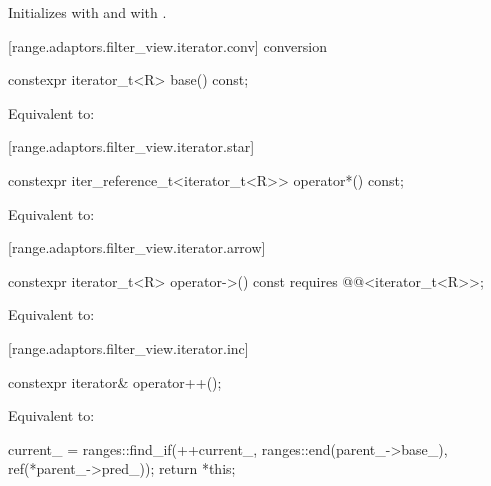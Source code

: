 \begin{addedblock}
\begin{itemdescr}
\pnum
\effects Initializes  with  and
 with .
\end{itemdescr}

[range.adaptors.filter_view.iterator.conv]{ conversion}

%
\begin{itemdecl}
constexpr iterator_t<R> base() const;
\end{itemdecl}

\begin{itemdescr}
\pnum
\effects Equivalent to: 
\end{itemdescr}

[range.adaptors.filter_view.iterator.star]{}

%
\begin{itemdecl}
constexpr iter_reference_t<iterator_t<R>> operator*() const;
\end{itemdecl}

\begin{itemdescr}
\pnum
\effects Equivalent to: 
\end{itemdescr}

[range.adaptors.filter_view.iterator.arrow]{}

%
\begin{itemdecl}
constexpr iterator_t<R> operator->() const
  requires @@<iterator_t<R>>;
\end{itemdecl}

\begin{itemdescr}
\pnum
\effects
Equivalent to: 
\end{itemdescr}

[range.adaptors.filter_view.iterator.inc]{}

%
\begin{itemdecl}
constexpr iterator& operator++();
\end{itemdecl}

\begin{itemdescr}
\pnum
\effects Equivalent to:
\begin{codeblock}
current_ = ranges::find_if(++current_, ranges::end(parent_->base_), ref(*parent_->pred_));
return *this;
\end{codeblock}
\end{itemdescr}


\end{addedblock}
